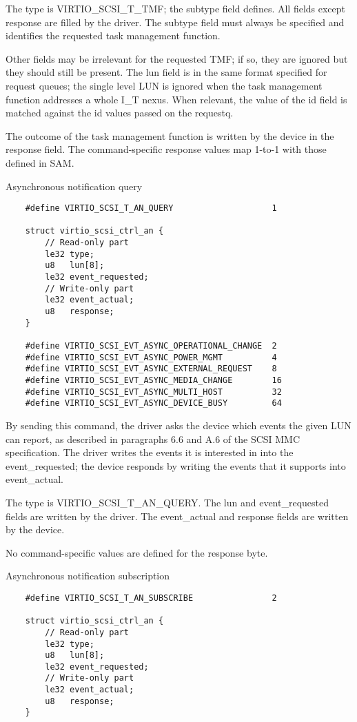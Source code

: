   The type is VIRTIO_SCSI_T_TMF; the subtype field defines. All
  fields except response are filled by the driver. The subtype
  field must always be specified and identifies the requested
  task management function.

  Other fields may be irrelevant for the requested TMF; if so,
  they are ignored but they should still be present. The lun
  field is in the same format specified for request queues; the
  single level LUN is ignored when the task management function
  addresses a whole I_T nexus. When relevant, the value of the id
  field is matched against the id values passed on the requestq.

  The outcome of the task management function is written by the
  device in the response field. The command-specific response
  values map 1-to-1 with those defined in SAM.

  Asynchronous notification query

\begin{lstlisting}
	#define VIRTIO_SCSI_T_AN_QUERY                    1

	struct virtio_scsi_ctrl_an {
	    // Read-only part
	    le32 type;
	    u8   lun[8];
	    le32 event_requested;
	    // Write-only part
	    le32 event_actual;
	    u8   response;
	}

	#define VIRTIO_SCSI_EVT_ASYNC_OPERATIONAL_CHANGE  2
	#define VIRTIO_SCSI_EVT_ASYNC_POWER_MGMT          4
	#define VIRTIO_SCSI_EVT_ASYNC_EXTERNAL_REQUEST    8
	#define VIRTIO_SCSI_EVT_ASYNC_MEDIA_CHANGE        16
	#define VIRTIO_SCSI_EVT_ASYNC_MULTI_HOST          32
	#define VIRTIO_SCSI_EVT_ASYNC_DEVICE_BUSY         64
\end{lstlisting}

  By sending this command, the driver asks the device which
  events the given LUN can report, as described in paragraphs 6.6
  and A.6 of the SCSI MMC specification. The driver writes the
  events it is interested in into the event_requested; the device
  responds by writing the events that it supports into
  event_actual.

  The type is VIRTIO_SCSI_T_AN_QUERY. The lun and event_requested
  fields are written by the driver. The event_actual and response
  fields are written by the device.

  No command-specific values are defined for the response byte.

  Asynchronous notification subscription
\begin{lstlisting}
	#define VIRTIO_SCSI_T_AN_SUBSCRIBE                2

	struct virtio_scsi_ctrl_an {
		// Read-only part
		le32 type;
		u8   lun[8];
		le32 event_requested;
		// Write-only part
		le32 event_actual;
		u8   response;
	}
\end{lstlisting}

